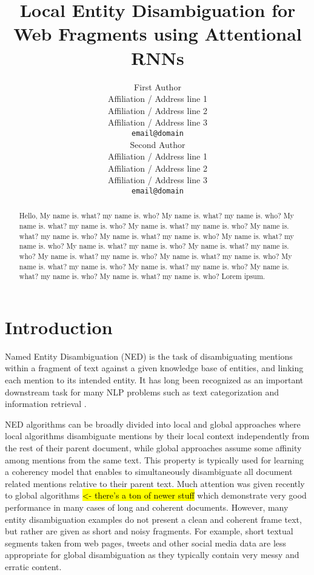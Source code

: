 \documentclass[11pt]{article}
\title{Local Entity Disambiguation for Web Fragments using Attentional RNNs}
\author{First Author \\
  Affiliation / Address line 1 \\
  Affiliation / Address line 2 \\
  Affiliation / Address line 3 \\
  {\tt email@domain} \\\And
  Second Author \\
  Affiliation / Address line 1 \\
  Affiliation / Address line 2 \\
  Affiliation / Address line 3 \\
  {\tt email@domain} \\}
\date{}
\begin{document}
\maketitle
\begin{abstract}
Hello, My name is. what? my name is. who?
My name is. what? my name is. who?
My name is. what? my name is. who?
My name is. what? my name is. who?
My name is. what? my name is. who?
My name is. what? my name is. who?
My name is. what? my name is. who?
My name is. what? my name is. who?
My name is. what? my name is. who?
My name is. what? my name is. who?
My name is. what? my name is. who?
My name is. what? my name is. who?
My name is. what? my name is. who?
My name is. what? my name is. who?
My name is. what? my name is. who? Lorem ipsum.
\end{abstract}

\section{Introduction}

Named Entity Disambiguation (NED) is the task of disambiguating mentions within a fragment of text against a given knowledge base of entities, and linking each mention to its intended entity. It has long been recognized as an important downstream task for many NLP problems such as text categorization \cite{gabrilovich2007computing} and information retrieval \cite{dalton2014entity}. 

NED algorithms can be broadly divided into local and global approaches where local algorithms disambiguate mentions by their local context independently from the rest of their parent document, while global approaches assume some affinity among mentions from the same text. This property is typically used for learning a coherency model that enables to simultaneously disambiguate all document related mentions relative to their parent text. Much attention was given recently to global algorithms \cite{ratinov2011local,guo2014entity,pershina2015personalized} \hl{<- there's a ton of newer stuff} which demonstrate very good performance in many cases of long and coherent documents. However, many entity disambiguation examples do not present a clean and coherent frame text, but rather are given as short and noisy fragments. For example, short textual segments taken from web pages, tweets and other social media data are less appropriate for global disambiguation as they typically contain very messy and erratic content. 
\end{document}
